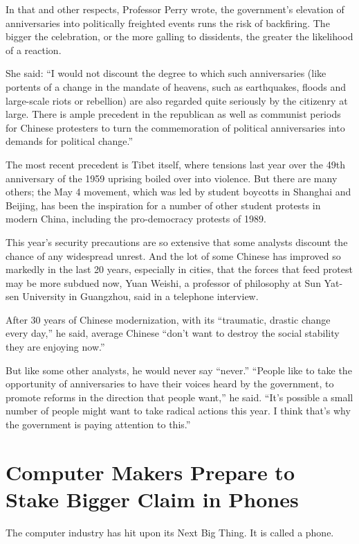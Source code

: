 \documentclass[12pt,a4paper,onecolumn]{article}
\begin{document}
\begin{CJK*}{GBK}{song}
In that and other respects, Professor Perry wrote, the government's elevation of anniversaries into
politically freighted events runs the risk of backfiring. The bigger the celebration, or the more
galling to dissidents, the greater the likelihood of a reaction.

She said: ``I would not discount the degree to which such anniversaries (like portents of a change
in the mandate of heavens, such as earthquakes, floods and large-scale riots or rebellion) are also
regarded quite seriously by the citizenry at large. There is ample precedent in the republican as
well as communist periods for Chinese protesters to turn the commemoration of political
anniversaries into demands for political change.''

The most recent precedent is Tibet itself, where tensions last year over the 49th anniversary of the
1959 uprising boiled over into violence. But there are many others; the May 4 movement, which was
led by student boycotts in Shanghai and Beijing, has been the inspiration for a number of other
student protests in modern China, including the pro-democracy protests of 1989.

This year's security precautions are so extensive that some analysts discount the chance of any
widespread unrest. And the lot of some Chinese has improved so markedly in the last 20 years,
especially in cities, that the forces that feed protest may be more subdued now, Yuan Weishi, a
professor of philosophy at Sun Yat-sen University in Guangzhou, said in a telephone interview.

After 30 years of Chinese modernization, with its ``traumatic, drastic change every day,'' he said,
average Chinese ``don't want to destroy the social stability they are enjoying now.''

But like some other analysts, he would never say ``never.'' ``People like to take the opportunity of
anniversaries to have their voices heard by the government, to promote reforms in the direction that
people want,'' he said. ``It's possible a small number of people might want to take radical actions
this year. I think that's why the government is paying attention to this.''

\section{Computer Makers Prepare to Stake Bigger Claim in Phones}

The computer industry has hit upon its Next Big Thing. It is called a phone.


\end{CJK*}
\end{document}
